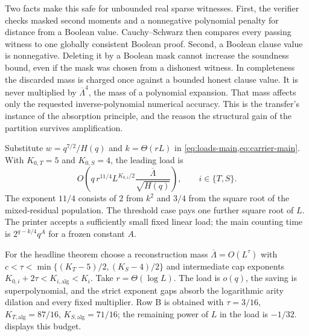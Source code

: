 \documentclass[11pt,letterpaper]{article}
\theoremstyle{definition}
\theoremstyle{remark}
\begin{document}
Two facts make this safe for unbounded real sparse witnesses. First,
the verifier checks masked second moments and a nonnegative polynomial
penalty for distance from a Boolean value. Cauchy--Schwarz then compares
every passing witness to one globally consistent Boolean proof.
Second, a Boolean clause value is nonnegative. Deleting it by a Boolean
mask cannot increase the soundness bound, even if the mask was chosen
from a dishonest witness. In completeness the discarded mass is charged
once against a bounded honest clause value. It is never multiplied by
$\overline\Lambda^4$, the mass of a polynomial expansion. That mass
affects only the requested inverse-polynomial numerical accuracy.
This is the transfer's instance of the absorption principle, and the
reason the structural gain of the partition survives amplification.

Substitute $w=q^{7/2}/H(q)$ and $k=\Theta(rL)$ in
\cref{eq:loads-main,eq:carrier-main}. With $K_{0,T}=5$ and $K_{0,S}=4$, the
leading load is
\begin{equation}
O\!\left(q\,r^{11/4}L^{K_{0,i}/2}
                 \frac{\overline\Lambda}{\sqrt{H(q)}}\right),
\qquad i\in\{T,S\}.
\label{eq:master-main}
\end{equation}
The exponent $11/4$ consists of $2$ from $k^2$ and $3/4$ from the
square root of the mixed-residual population. The threshold case pays
one further square root of $L$. The printer accepts a sufficiently
small fixed linear load; the main counting time is
$2^{q-k/4}q^{A}$ for a frozen constant $A$.

For the headline theorem choose a reconstruction mass
$\overline\Lambda=O(L^\tau)$ with
$c<\tau<\min\{(K_T-5)/2,(K_S-4)/2\}$ and intermediate cap exponents
$K_{0,i}+2\tau<K_{i,\mathrm{alg}}<K_i$. Take
$r=\Theta(\log L)$. The load is $o(q)$, the saving is
superpolynomial, and the strict exponent gaps absorb the logarithmic
arity dilation and every fixed multiplier. Row B is obtained with
$\tau=3/16$, $K_{T,\mathrm{alg}}=87/16$,
$K_{S,\mathrm{alg}}=71/16$; the remaining power of $L$ in the load
is $-1/32$.  displays this budget.
\end{document}
